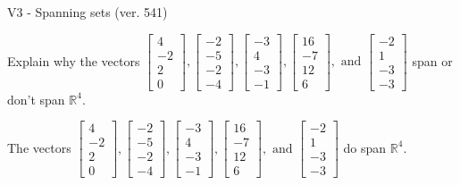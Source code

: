 \begin{exercise}
  \begin{exerciseTitle}V3 - Spanning sets (ver. 541)\end{exerciseTitle}
  \begin{exerciseStatement}
    Explain why the vectors \(\left[\begin{array}{r}
4 \\
-2 \\
2 \\
0
\end{array}\right] , \left[\begin{array}{r}
-2 \\
-5 \\
-2 \\
-4
\end{array}\right] , \left[\begin{array}{r}
-3 \\
4 \\
-3 \\
-1
\end{array}\right] , \left[\begin{array}{r}
16 \\
-7 \\
12 \\
6
\end{array}\right] , \text{ and } \left[\begin{array}{r}
-2 \\
1 \\
-3 \\
-3
\end{array}\right]\) span or don't span \(\mathbb{R}^4\). 
	


  \end{exerciseStatement}
  \begin{exerciseAnswer}
   The vectors \(\left[\begin{array}{r}
4 \\
-2 \\
2 \\
0
\end{array}\right] , \left[\begin{array}{r}
-2 \\
-5 \\
-2 \\
-4
\end{array}\right] , \left[\begin{array}{r}
-3 \\
4 \\
-3 \\
-1
\end{array}\right] , \left[\begin{array}{r}
16 \\
-7 \\
12 \\
6
\end{array}\right] , \text{ and } \left[\begin{array}{r}
-2 \\
1 \\
-3 \\
-3
\end{array}\right]\) 
  	 do  
	span \(\mathbb{R}^4\).
  



\end{exerciseAnswer}
\end{exercise}
